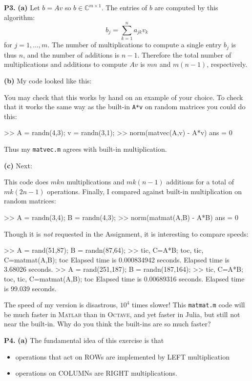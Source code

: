 \documentclass[11pt]{amsart}
\newcommand{\CC}{{\mathbb{C}}}
\newcommand{\Matlab}{\textsc{Matlab}\xspace}
\newcommand{\Octave}{\textsc{Octave}\xspace}
\newcommand{\mfile}[1]{
\begin{quote}
\bigskip
\VerbatimInput[frame=single,framesep=3mm,label=\fbox{\normalsize \textsl{\,#1\,}},fontfamily=courier,fontsize=\footnotesize]{../matlab/#1}
\medskip
\end{quote}
}
\newcommand{\prob}[1]{\bigskip\noindent\large\textbf{#1.} \normalsize}
\newcommand{\ppart}[1]{\textbf{(#1)} }
\newcommand{\epart}[1]{\medskip\noindent\ppart{#1}}
\begin{document}
\prob{P3}  \ppart{a}  Let $b=Av$ so $b\in \CC^{m\times 1}$.  The entries of $b$ are computed by this algorithm:
    $$b_j = \sum_{k=1}^n a_{jk} v_k$$
for $j=1,\dots,m$.  The number of multiplications to compute a single entry $b_j$ is thus $n$, and the number of additions is $n-1$.  Therefore the total number of multiplications and additions to compute $Av$ is $mn$ and $m(n-1)$, respectively.

\clearpage
\newpage
\epart{b}  My code looked like this:

\mfile{matvec.m}

\noindent You may check that this works by hand on an example of your choice.  To check that it works the same way as the built-in \texttt{A*v} on random matrices you could do this:
\begin{mVerb}
>> A = randn(4,3);  v = randn(3,1);
>> norm(matvec(A,v) - A*v)
ans = 0
\end{mVerb}
Thus my \texttt{matvec.m} agrees with built-in multiplication.

\epart{c}  Next:

\mfile{matmat.m}

This code does $mkn$ multiplications and $mk(n-1)$ additions for a total of $mk(2n-1)$ operations.  Finally, I compared against built-in multiplication on random matrices:
\begin{mVerb}
>> A = randn(3,4);  B = randn(4,3);
>> norm(matmat(A,B) - A*B)
ans = 0
\end{mVerb}

\medskip
Though it is \emph{not} requested in the Assignment, it is interesting to compare speeds:
\begin{mVerb}
>> A = rand(51,87);  B = randn(87,64);
>> tic, C=A*B; toc, tic, C=matmat(A,B); toc
Elapsed time is 0.000834942 seconds.
Elapsed time is 3.68026 seconds.
>> A = rand(251,187);  B = randn(187,164);
>> tic, C=A*B; toc, tic, C=matmat(A,B); toc
Elapsed time is 0.00689316 seconds.
Elapsed time is 99.039 seconds.
\end{mVerb}
The speed of my version is disastrous, $10^4$ times slower!  This \texttt{matmat.m} code will be much faster in \Matlab than in \Octave, and yet faster in Julia, but still not near the built-in.  Why do you think the built-ins are so much faster?


\prob{P4}  \ppart{a}  The fundamental idea of this exercise is that
\begin{itemize}
\item operations that act on ROWs are implemented by LEFT multiplication
\item operations on COLUMNs are RIGHT multiplications.
\end{itemize}
\end{document}
